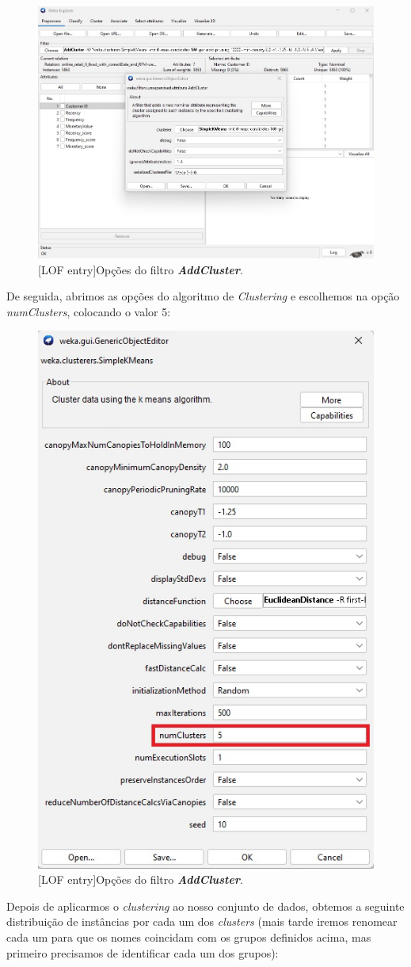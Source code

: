 \documentclass{easychair}
\begin{document}
\begin{figure}[H]
    \begin{centering}
    \includegraphics[width=0.6\linewidth]{imagens/figure17.jpg}\label{cap-3-fig17}
    [LOF entry]{Opções do filtro \textit{\textbf{AddCluster}}.}
    \label{fig17}
    \end{centering}
\end{figure}

De seguida, abrimos as opções do algoritmo de \textit{Clustering} e escolhemos na opção \textit{numClusters}, colocando o valor 5:

\begin{figure}[H]
    \begin{centering}
    \includegraphics[width=0.4\linewidth]{imagens/figure18.jpg}\label{cap-3-fig18}
    [LOF entry]{Opções do filtro \textit{\textbf{AddCluster}}.}
    \label{fig18}
    \end{centering}
\end{figure}

Depois de aplicarmos o \textit{clustering} ao nosso conjunto de dados, obtemos a seguinte distribuição de instâncias por cada um dos \textit{clusters} (mais tarde iremos renomear cada um para que os nomes coincidam com os grupos definidos acima, mas primeiro precisamos de identificar cada um dos grupos):
\end{document}
